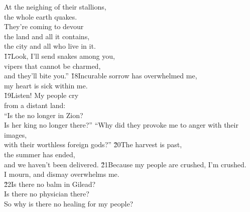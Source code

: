 \begin{poetry}
\poemll    At the neighing of their stallions, \\
\poemlll       the whole earth quakes. \\
\poeml They're coming to devour \\
\poemll    the land and all it contains, \\
\poemlll       the city and all who live in it. \\
\poeml \v{17}Look, I'll send snakes among you, \\
\poemll    vipers that cannot be charmed, \\
\poemlll       and they'll bite you.''
\poeml \v{18}Incurable sorrow has overwhelmed me, \\
\poemll    my heart is sick within me. \\
\poeml \v{19}Listen! My people cry \\
\poemll    from a distant land: \\
\poeml ``Is the  no longer in Zion? \\
\poemll    Is her king no longer there?''
\poeml ``Why did they provoke me to anger with their images, \\
\poemll    with their worthless foreign gods?''
\poeml \v{20}The harvest is past, \\
\poemll    the summer has ended, \\
\poemlll       and we haven't been delivered.
\poeml \v{21}Because my people are crushed, I'm crushed. \\
\poemll    I mourn, and dismay overwhelms me. \\
\poeml \v{22}Is there no balm in Gilead? \\
\poemll    Is there no physician there? \\
\poemlll       So why is there no healing for my people?
\end{poetry}


